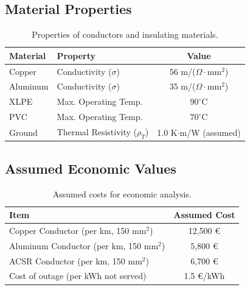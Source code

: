 \documentclass[12pt, a4paper]{article}
\begin{document}
\subsection{Material Properties}
\begin{table}[htbp]
    \centering
    \caption{Properties of conductors and insulating materials.}
    \label{tab:material_properties}
    \begin{tabular}{@{}llc@{}}
        \toprule
        \textbf{Material} & \textbf{Property} & \textbf{Value} \\ \midrule
        Copper & Conductivity ($\sigma$) & 56 m/($\Omega \cdot \text{mm}^2$) \\
        Aluminum & Conductivity ($\sigma$) & 35 m/($\Omega \cdot \text{mm}^2$) \\
        \midrule
        XLPE & Max. Operating Temp. & $90^\circ$C \\
        PVC & Max. Operating Temp. & $70^\circ$C \\
        \midrule
        Ground & Thermal Resistivity ($\rho_T$) & 1.0 K$\cdot$m/W (assumed) \\
        \bottomrule
    \end{tabular}
\end{table}

\subsection{Assumed Economic Values}
\begin{table}[htbp]
    \centering
    \caption{Assumed costs for economic analysis.}
    \label{tab:economic_values}
    \begin{tabular}{@{}lc@{}}
        \toprule
        \textbf{Item} & \textbf{Assumed Cost} \\ \midrule
        Copper Conductor (per km, 150 $\text{mm}^2$) & 12,500 € \\
        Aluminum Conductor (per km, 150 $\text{mm}^2$) & 5,800 € \\
        ACSR Conductor (per km, 150 $\text{mm}^2$) & 6,700 € \\
        Cost of outage (per kWh not served) & 1.5 €/kWh \\
        \bottomrule
    \end{tabular}
\end{table}
\end{document}
